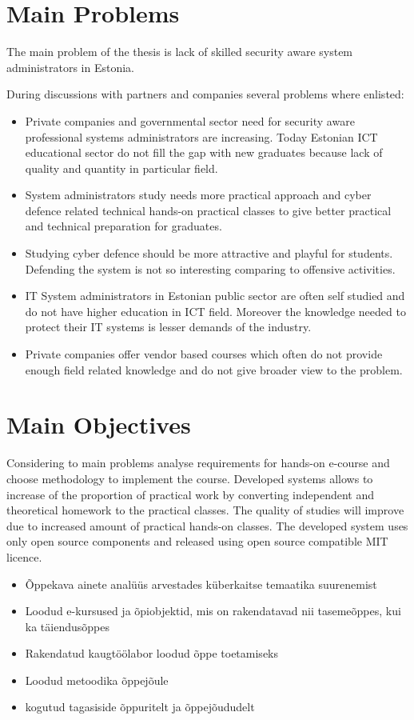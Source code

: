 \section{Main Problems}
The main problem of the thesis is lack of skilled security aware system administrators in Estonia.

During discussions with partners and companies several problems where enlisted:
\begin{itemize}
\item Private companies and governmental sector need for security aware professional systems administrators are increasing. Today Estonian \gls{ICT} educational sector do not fill the gap with new graduates because lack of quality and quantity in particular field. 
\item System administrators study needs more practical approach and cyber defence related technical hands-on practical classes to give better practical and technical preparation for graduates.
\item Studying cyber defence should be more attractive and playful for students. Defending the system is not so interesting comparing to offensive activities.
\item IT System administrators in Estonian public sector are often self studied  and do not have higher education in \gls{ICT} field. Moreover the knowledge needed to protect their IT systems is lesser demands of the industry.
\item Private companies offer vendor based courses which often do not provide enough field related knowledge and do not give broader view to the problem.
\end{itemize}

\section{Main Objectives}
Considering to main problems analyse requirements for hands-on e-course and choose methodology to implement the course.
Developed systems allows to  increase of the proportion of practical work by converting independent and theoretical homework to  the practical classes. The quality of studies will improve due to increased amount of practical hands-on classes. The developed system uses only open source components and released using open source compatible MIT licence.



\begin{itemize}
	\item Õppekava ainete analüüs arvestades küberkaitse temaatika suurenemist
	\item Loodud e-kursused ja õpiobjektid, mis on rakendatavad nii tasemeõppes, kui ka täiendusõppes
	\item Rakendatud kaugtöölabor loodud õppe toetamiseks
	\item Loodud metoodika õppejõule
	\item kogutud tagasiside õppuritelt ja õppejõududelt
\end{itemize}


